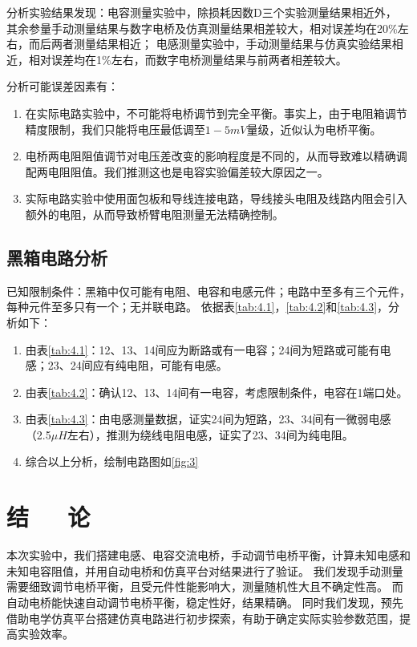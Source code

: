 \documentclass[10pt,a4paper,twocolumn,twoside,UTF8]{ctexart}
\begin{document}
		分析实验结果发现：电容测量实验中，除损耗因数D三个实验测量结果相近外，
		其余参量手动测量结果与数字电桥及仿真测量结果相差较大，相对误差均在20\%左右，而后两者测量结果相近；
		电感测量实验中，手动测量结果与仿真实验结果相近，相对误差均在1\%左右，而数字电桥测量结果与前两者相差较大。

		分析可能误差因素有：
		\begin{enumerate}[label=\arabic*.]
			\item 在实际电路实验中，不可能将电桥调节到完全平衡。事实上，由于电阻箱调节精度限制，我们只能将电压最低调至$1-5mV$量级，近似认为电桥平衡。
			\item 电桥两电阻阻值调节对电压差改变的影响程度是不同的，从而导致难以精确调配两电阻阻值。我们推测这也是电容实验偏差较大原因之一。
			\item 实际电路实验中使用面包板和导线连接电路，导线接头电阻及线路内阻会引入额外的电阻，从而导致桥臂电阻测量无法精确控制。
		\end{enumerate}

	\subsection{黑箱电路分析}
	已知限制条件：黑箱中仅可能有电阻、电容和电感元件；电路中至多有三个元件，每种元件至多只有一个；无并联电路。
	依据表\ref{tab:4.1}，\ref{tab:4.2}和\ref{tab:4.3}，分析如下：
	\begin{enumerate}[label=\arabic*.]
		\item 由表\ref{tab:4.1}：12、13、14间应为断路或有一电容；24间为短路或可能有电感；23、24间应有纯电阻，可能有电感。
		\item 由表\ref{tab:4.2}：确认12、13、14间有一电容，考虑限制条件，电容在1端口处。
		\item 由表\ref{tab:4.3}：由电感测量数据，证实24间为短路，23、34间有一微弱电感（2.5$\mu H$左右），推测为绕线电阻电感，证实了23、34间为纯电阻。
		\item 综合以上分析，绘制电路图如\ref{fig:3}
	\end{enumerate}


\section{结~~~论}
	本次实验中，我们搭建电感、电容交流电桥，手动调节电桥平衡，计算未知电感和未知电容阻值，并用自动电桥和仿真平台对结果进行了验证。
	我们发现手动测量需要细致调节电桥平衡，且受元件性能影响大，测量随机性大且不确定性高。
	而自动电桥能快速自动调节电桥平衡，稳定性好，结果精确。
	同时我们发现，预先借助电学仿真平台搭建仿真电路进行初步探索，有助于确定实际实验参数范围，提高实验效率。
\end{document}
